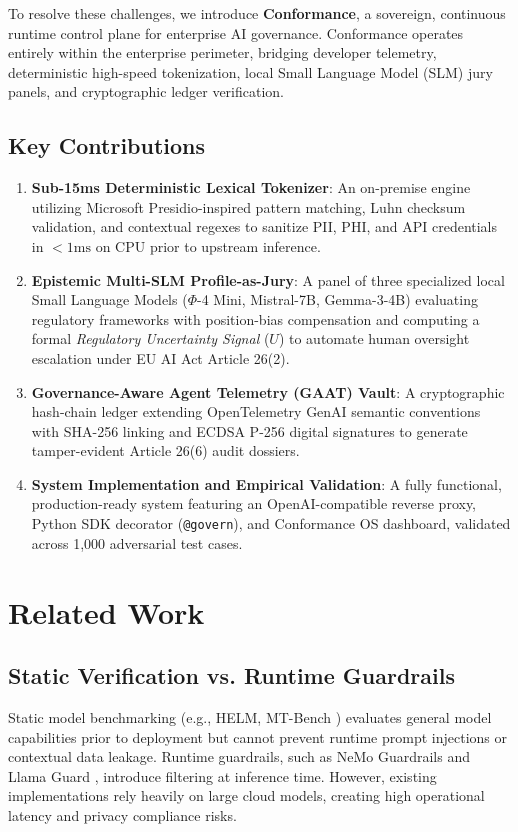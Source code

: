 \documentclass[conference,10pt]{IEEEtran}
\begin{document}
To resolve these challenges, we introduce \textbf{Conformance}, a sovereign, continuous runtime control plane for enterprise AI governance. Conformance operates entirely within the enterprise perimeter, bridging developer telemetry, deterministic high-speed tokenization, local Small Language Model (SLM) jury panels, and cryptographic ledger verification.

\subsection{Key Contributions}
\begin{enumerate}
    \item \textbf{Sub-15ms Deterministic Lexical Tokenizer}: An on-premise engine utilizing Microsoft Presidio-inspired pattern matching, Luhn checksum validation, and contextual regexes to sanitize PII, PHI, and API credentials in $<1\text{ms}$ on CPU prior to upstream inference.
    \item \textbf{Epistemic Multi-SLM Profile-as-Jury}: A panel of three specialized local Small Language Models ($\Phi$-4 Mini, Mistral-7B, Gemma-3-4B) evaluating regulatory frameworks with position-bias compensation and computing a formal \textit{Regulatory Uncertainty Signal} ($U$) to automate human oversight escalation under EU AI Act Article 26(2).
    \item \textbf{Governance-Aware Agent Telemetry (GAAT) Vault}: A cryptographic hash-chain ledger extending OpenTelemetry GenAI semantic conventions with SHA-256 linking and ECDSA P-256 digital signatures to generate tamper-evident Article 26(6) audit dossiers.
    \item \textbf{System Implementation and Empirical Validation}: A fully functional, production-ready system featuring an OpenAI-compatible reverse proxy, Python SDK decorator (\texttt{@govern}), and Conformance OS dashboard, validated across 1,000 adversarial test cases.
\end{enumerate}

\section{Related Work}
\label{sec:related}

\subsection{Static Verification vs. Runtime Guardrails}
Static model benchmarking (e.g., HELM, MT-Bench \cite{zheng2023judging}) evaluates general model capabilities prior to deployment but cannot prevent runtime prompt injections or contextual data leakage. Runtime guardrails, such as NeMo Guardrails and Llama Guard \cite{kumar2023certifying}, introduce filtering at inference time. However, existing implementations rely heavily on large cloud models, creating high operational latency and privacy compliance risks.
\end{document}
